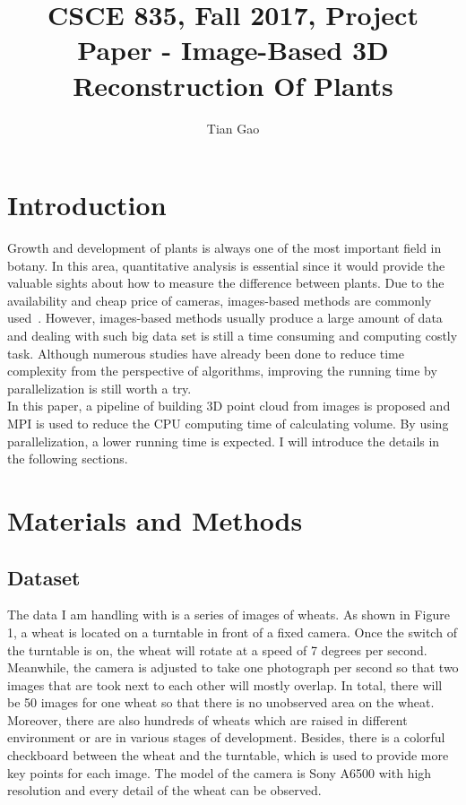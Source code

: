 \documentclass[a4paper]{article}
\title{CSCE 835, Fall 2017, Project Paper - Image-Based 3D Reconstruction Of Plants}
\author{Tian Gao}
\begin{document}
\maketitle

\section{Introduction}
Growth and development of plants is always one of the most important field in botany. In this area, quantitative analysis is essential since it would provide the valuable sights about how to measure the difference between plants. Due to the availability and cheap price of cameras, images-based methods are commonly used~\cite{1}.
However, images-based methods usually produce a large amount of data and dealing  with such big data set is still a time consuming and computing costly task. Although numerous studies have already been done to reduce time complexity from the perspective of algorithms, improving the running time by parallelization is still worth a try.\\
In this paper, a pipeline of building 3D point cloud from images is proposed and MPI is used to reduce the CPU computing time of calculating volume. By using parallelization, a lower running time is expected. I will introduce the details in the following sections.\\

\section{Materials and Methods}
\subsection{Dataset}
The data I am handling with is a series of images of wheats. As shown in Figure 1, a wheat is located on a turntable in front of a fixed camera. Once the switch of the turntable is on, the wheat will rotate at a speed of 7 degrees per second. Meanwhile, the camera is adjusted to take one photograph per second so that two images that are took next to each other will mostly overlap. In total, there will be 50 images for one wheat so that there is no unobserved area on the wheat. Moreover, there are also hundreds of wheats which are raised in different environment or are in various stages of development. Besides, there is a colorful checkboard between the wheat and the turntable, which is used to provide more key points for each image. The model of the camera is Sony A6500 with high resolution and every detail of the wheat can be observed.\\
\end{document}
